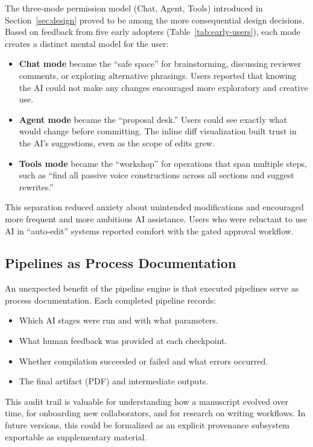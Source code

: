 The three-mode permission model (Chat, Agent, Tools) introduced in
Section~\ref{sec:design} proved to be among the more consequential design
decisions. Based on feedback from five early adopters
(Table~\ref{tab:early-users}), each mode creates a distinct mental model
for the user:

\begin{itemize}
  \item \textbf{Chat mode} became the ``safe space'' for brainstorming,
  discussing reviewer comments, or exploring alternative phrasings. Users
  reported that knowing the AI could not make any changes encouraged more
  exploratory and creative use.
  \item \textbf{Agent mode} became the ``proposal desk.'' Users could see
  exactly what would change before committing. The inline diff visualization
  built trust in the AI's suggestions, even as the scope of edits grew.
  \item \textbf{Tools mode} became the ``workshop'' for operations that span
  multiple steps, such as ``find all passive voice constructions across all
  sections and suggest rewrites.''
\end{itemize}

This separation reduced anxiety about unintended modifications and
encouraged more frequent and more ambitious AI
assistance. Users who were reluctant to use AI in ``auto-edit'' systems
reported comfort with the gated approval workflow.

\subsection{Pipelines as Process Documentation}

An unexpected benefit of the pipeline engine is that executed pipelines serve
as process documentation. Each completed pipeline records:
\begin{itemize}
  \item Which AI stages were run and with what parameters.
  \item What human feedback was provided at each checkpoint.
  \item Whether compilation succeeded or failed and what errors occurred.
  \item The final artifact (PDF) and intermediate outputs.
\end{itemize}
This audit trail is valuable for understanding how a manuscript evolved over
time, for onboarding new collaborators, and for research on writing workflows.
In future versions, this could be formalized as an explicit provenance
subsystem exportable as supplementary material.

